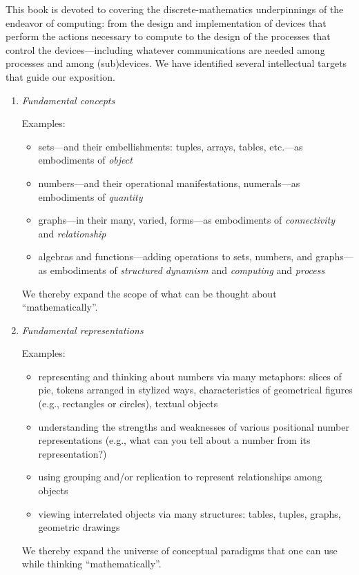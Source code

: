 This book is devoted to covering the discrete-mathematics
underpinnings of the endeavor of computing: from the design and
implementation of devices that perform the actions necessary to
compute to the design of the processes that control the
devices---including whatever communications are needed among processes
and among (sub)devices.  We have identified several intellectual
targets that guide our exposition.
\begin{enumerate}
\item
{\it Fundamental concepts}

\medskip

{\small\sf Examples:}
\begin{itemize}
\item%
sets---and their embellishments: tuples, arrays, tables, etc.---as
embodiments of {\it object}
\item
numbers---and their operational manifestations, numerals---as
embodiments of {\it quantity}
\item
graphs---in their many, varied, forms---as embodiments of {\it
  connectivity} and {\it relationship}
\item
algebras and functions---adding operations to sets, numbers, and
graphs---as embodiments of {\it structured dynamism} and {\it
  computing} and {\it process}
\end{itemize}
We thereby expand the scope of what can be thought about
``mathematically''.

\medskip

\item
{\it Fundamental representations}

\medskip

{\small\sf Examples:}
\begin{itemize}
\item
representing and thinking about numbers via many metaphors: slices of
pie, tokens arranged in stylized ways, characteristics of geometrical
figures (e.g., rectangles or circles), textual objects
\item
understanding the strengths and weaknesses of various positional
number representations (e.g., what can you tell about a number from
its representation?)
\item
using grouping and/or replication to represent relationships among
objects
\item
viewing interrelated objects via many structures: tables, tuples,
graphs, geometric drawings
\end{itemize}
We thereby expand the universe of conceptual paradigms that one can
use while thinking ``mathematically''.


\end{enumerate}
